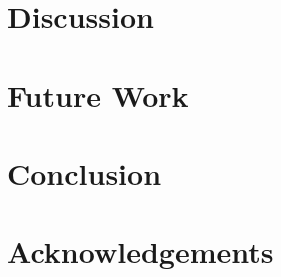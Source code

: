 \documentclass{ubicomp2011}
\begin{document}
\section{Discussion}

\section{Future Work}

\section{Conclusion}

\section{Acknowledgements}



\end{document}
